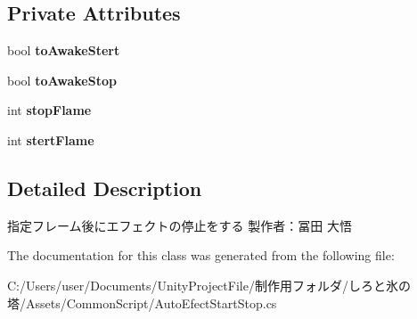 \subsection*{Private Attributes}
\begin{DoxyCompactItemize}
\item 
\mbox{\label{class_auto_efect_start_stop_aec3b4aeb916797533f2764423e799660}} 
bool {\bfseries to\+Awake\+Stert}
\item 
\mbox{\label{class_auto_efect_start_stop_af18e5c2567b2ecc66a2abcde15b5ad75}} 
bool {\bfseries to\+Awake\+Stop}
\item 
\mbox{\label{class_auto_efect_start_stop_ad300f70d333b9aa3e310b593f4f666fa}} 
int {\bfseries stop\+Flame}
\item 
\mbox{\label{class_auto_efect_start_stop_ac5c56ef68375e3fe8eb4762031f54468}} 
int {\bfseries stert\+Flame}
\end{DoxyCompactItemize}


\subsection{Detailed Description}
指定フレーム後にエフェクトの停止をする 製作者：冨田 大悟 



The documentation for this class was generated from the following file\+:\begin{DoxyCompactItemize}
\item 
C\+:/\+Users/user/\+Documents/\+Unity\+Project\+File/制作用フォルダ/しろと氷の塔/\+Assets/\+Common\+Script/Auto\+Efect\+Start\+Stop.\+cs\end{DoxyCompactItemize}
